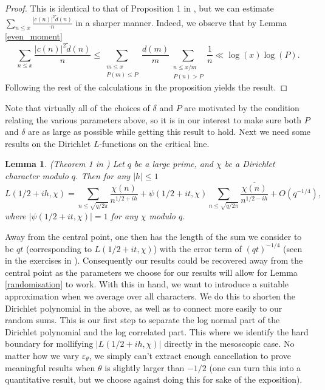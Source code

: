 \documentclass[10pt,a4paper]{amsart}
\newtheorem{lemma}{Lemma}
\numberwithin{equation}{section}
\begin{document}
\begin{proof}
This is identical to that of Proposition 1 in \cite{harper2023typicalsizecharacterzeta}, but we can estimate $\sum_{n \leq x}\frac{|c(n)|^2\tilde{d}(n)}{n}$ in a sharper manner. Indeed, we observe that by Lemma \ref{even_moment}
$$\sum_{n \leq x}\frac{|c(n)|^2\tilde{d}(n)}{n} \leq \sum_{\substack{m \leq x \\ P(m) \leq P}}\frac{d(m)}{m}\sum_{\substack{n \leq x/m \\ P(n) > P}}\frac{1}{n} \ll \log(x)\log(P).$$
Following the rest of the calculations in the proposition yields the result.
\end{proof}
Note that virtually all of the choices of $\delta$ and $P$ are motivated by the condition relating the various parameters above, so it is in our interest to make sure both $P$ and $\delta$ are as large as possible while getting this result to hold. Next we need some results on the Dirichlet $L$-functions on the critical line.
\begin{lemma}
    (Theorem 1 in \cite{davies1965}) Let $q$ be a large prime, and $\chi$ be a Dirichlet character modulo $q$. Then for any $|h| \leq 1$
    $$L(1/2+ih,\chi) = \sum_{n \leq \sqrt{q/2\pi}}\frac{\chi(n)}{n^{1/2+ih}} + \psi(1/2+it,\chi)\sum_{n \leq \sqrt{q/2\pi}}\frac{\overline{\chi(n)}}{n^{1/2-ih}} + O(q^{-1/4}),$$
    where $|\psi(1/2+it,\chi)|=1$ for any $\chi$ modulo $q$.
\label{Dirichlet_AFE}
\end{lemma}
Away from the central point, one then has the length of the sum we consider to be $qt$ (corresponding to $L(1/2+it,\chi)$) with the error term of $(qt)^{-1/4}$ (seen in the exercises in \cite{koukoulopoulos2019distribution}). Consequently our results could be recovered away from the central point as the parameters we choose for our results will allow for Lemma \ref{randomisation} to work. With this in hand, we want to introduce a suitable approximation when we average over all characters. We do this to shorten the Dirichlet polynomial in the above, as well as to connect more easily to our random sums. This is our first step to separate the log normal part of the Dirichlet polynomial and the log correlated part. This where we identify the hard boundary for mollifying $|L(1/2+ih,\chi)|$ directly in the mesoscopic case. No matter how we vary $\varepsilon_\theta$, we simply can't extract enough cancellation to prove meaningful results when $\theta$ is slightly larger than $-1/2$ (one can turn this into a quantitative result, but we choose against doing this for sake of the exposition).
\end{document}
